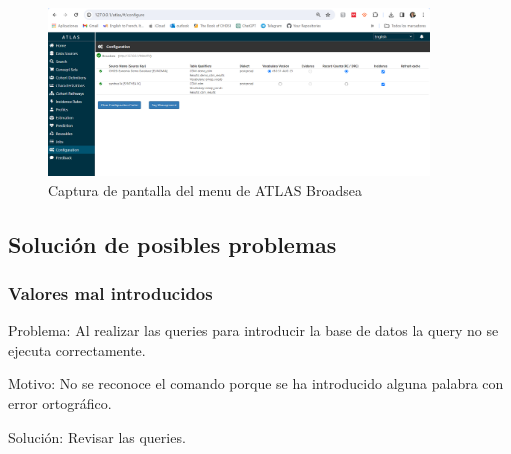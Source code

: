 \begin{enumerate}[label=\alph*]
\begin{figure}[H]
    \centering
    \includegraphics[width=0.90\textwidth]{figures/showConfiguration.png}
    \caption{Captura de pantalla del menu  de ATLAS Broadsea}
    \label{fig:showConfiguration}
\end{figure}
\end{enumerate}

\subsection{Solución de posibles problemas}


\subsubsection{Valores mal introducidos}

Problema: Al realizar las queries para introducir la base de datos la query no se ejecuta correctamente.

Motivo: No se reconoce el comando porque se ha introducido alguna palabra con error ortográfico.

Solución: Revisar las queries.





